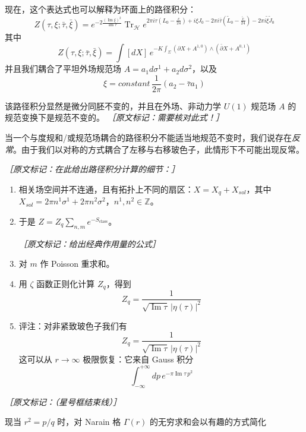现在，这个表达式也可以解释为环面上的路径积分：
\begin{equation}
  Z(\tau,\xi;\bar\tau,\bar\xi)
  =e^{-2\frac{(\operatorname{Im}\xi)^2}{\operatorname{Im}\tau}}\operatorname{Tr}_{\mathcal{H}}e^{2\pi i\tau(L_0-\frac{c}{24})+i\xi J_0-2\pi i\bar\tau(\tilde L_0-\frac{\tilde c}{24})-2\pi i\tilde\xi\tilde J_0}
  \tag{2.329}
  \label{eq:2.329}
\end{equation}
其中
\begin{equation}
  Z(\tau,\xi;\bar\tau,\bar\xi)=\int[dX]\,e^{-K\int_\Sigma(\partial X+A^{1,0})\wedge(\bar\partial X+A^{0,1})}
  \tag{2.330}
  \label{eq:2.330}
\end{equation}
并且我们耦合了平坦外场规范场 $A=a_1d\sigma^1+a_2d\sigma^2$，以及
\begin{equation}
  \xi=\mathit{constant}\,\frac{1}{2\pi}(a_2-\bar\tau a_1)
  \tag{2.331}
  \label{eq:2.331}
\end{equation}

该路径积分显然是微分同胚不变的，并且在外场、非动力学 $U(1)$ 规范场 $A$ 的规范变换下是规范不变的。
{\small\itshape ［原文标记：需要核对此式！］}

当一个与度规和/或规范场耦合的路径积分不能适当地规范不变时，我们说存在\emph{反常}。由于我们以对称的方式耦合了左移与右移玻色子，此情形下不可能出现反常。

{\small\itshape ［原文标记：在此给出路径积分计算的细节：］}
\begin{enumerate}
  \item 相关场空间并不连通，且有拓扑上不同的扇区：$X=X_q+X_{sol}$，其中 $X_{sol}=2\pi n^1\sigma^1+2\pi n^2\sigma^2$，$n^1,n^2\in\mathbb{Z}$。
  \item 于是 $Z=Z_q\sum_{n,m}e^{-S_{\mathrm{class}}}$。

  {\small\itshape ［原文标记：给出经典作用量的公式］}

  \item 对 $m$ 作 Poisson 重求和。
  \item 用 $\zeta$ 函数正则化计算 $Z_q$，得到
  \begin{equation}
    Z_q=\frac{1}{\sqrt{\operatorname{Im}\tau}\,|\eta(\tau)|^2}
    \tag{2.332}
    \label{eq:2.332}
  \end{equation}
  \item 评注：对非紧致玻色子我们有
  \begin{equation}
    Z_q=\frac{1}{\sqrt{\operatorname{Im}\tau}\,|\eta(\tau)|^2}
    \tag{2.333}
    \label{eq:2.333}
  \end{equation}
  这可以从 $r\to\infty$ 极限恢复：它来自 Gauss 积分
  \begin{equation}
    \int_{-\infty}^{+\infty}dp\,e^{-\pi\operatorname{Im}\tau\,p^2}
    \tag{2.334}
    \label{eq:2.334}
  \end{equation}
\end{enumerate}

{\small\itshape ［原文标记：（星号框结束线）］}

现当 $r^2=p/q$ 时，对 Narain 格 $\Gamma(r)$ 的无穷求和会以有趣的方式简化
